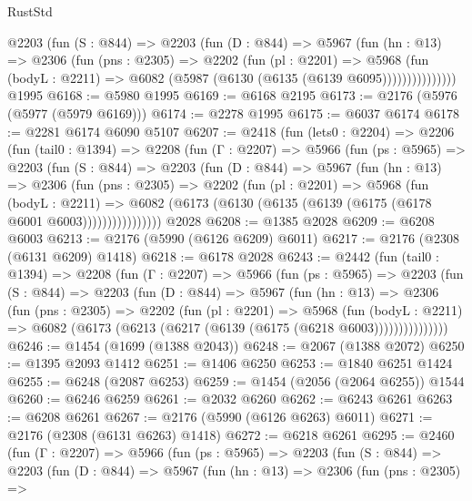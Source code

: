 \begin{lexlean}{RustStd}
\begin{coremodule}
            @2203
              (fun (S : @844) =>
              @2203
                (fun (D : @844) =>
                @5967
                  (fun (hn : @13) =>
                  @2306
                    (fun (pns : @2305) =>
                    @2202
                      (fun (pl : @2201) =>
                      @5968
                        (fun (bodyL : @2211) =>
                        @6082 (@5987 (@6130 (@6135 (@6139 @6095)))))))))))))))
    @1995
@6168 := @5980 @1995
@6169 := @6168 @2195
@6173 := @2176 (@5976 (@5977 (@5979 @6169)))
@6174 := @2278 @1995
@6175 := @6037 @6174
@6178 := @2281 @6174 @6090 @5107
@6207 := @2418
    (fun (lets0 : @2204) =>
    @2206
      (fun (tail0 : @1394) =>
      @2208
        (fun (Γ : @2207) =>
        @5966
          (fun (ps : @5965) =>
          @2203
            (fun (S : @844) =>
            @2203
              (fun (D : @844) =>
              @5967
                (fun (hn : @13) =>
                @2306
                  (fun (pns : @2305) =>
                  @2202
                    (fun (pl : @2201) =>
                    @5968
                      (fun (bodyL : @2211) =>
                      @6082 (@6173 (@6130 (@6135 (@6139 (@6175 (@6178 @6001 @6003))))))))))))))))
    @2028
@6208 := @1385 @2028
@6209 := @6208 @6003
@6213 := @2176 (@5990 (@6126 @6209) @6011)
@6217 := @2176 (@2308 (@6131 @6209) @1418)
@6218 := @6178 @2028
@6243 := @2442
    (fun (tail0 : @1394) =>
    @2208
      (fun (Γ : @2207) =>
      @5966
        (fun (ps : @5965) =>
        @2203
          (fun (S : @844) =>
          @2203
            (fun (D : @844) =>
            @5967
              (fun (hn : @13) =>
              @2306
                (fun (pns : @2305) =>
                @2202
                  (fun (pl : @2201) =>
                  @5968
                    (fun (bodyL : @2211) =>
                    @6082 (@6173 (@6213 (@6217 (@6139 (@6175 (@6218 @6003)))))))))))))))
@6246 := @1454 (@1699 (@1388 @2043))
@6248 := @2067 (@1388 @2072)
@6250 := @1395 @2093 @1412
@6251 := @1406 @6250
@6253 := @1840 @6251 @1424
@6255 := @6248 (@2087 @6253)
@6259 := @1454 (@2056 (@2064 @6255)) @1544
@6260 := @6246 @6259
@6261 := @2032 @6260
@6262 := @6243 @6261
@6263 := @6208 @6261
@6267 := @2176 (@5990 (@6126 @6263) @6011)
@6271 := @2176 (@2308 (@6131 @6263) @1418)
@6272 := @6218 @6261
@6295 := @2460
    (fun (Γ : @2207) =>
    @5966
      (fun (ps : @5965) =>
      @2203
        (fun (S : @844) =>
        @2203
          (fun (D : @844) =>
          @5967
            (fun (hn : @13) =>
            @2306
              (fun (pns : @2305) =>

\end{coremodule}
\end{lexlean}

